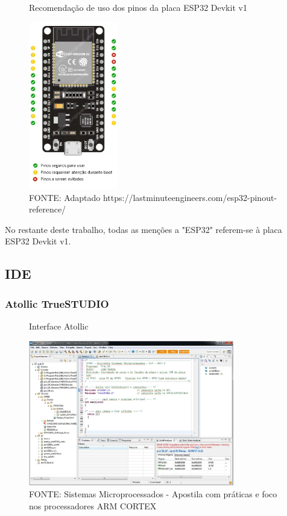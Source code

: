 \begin{figure}[ht]
	\centering
	\caption{Recomendação de uso dos pinos da placa ESP32 Devkit v1}
	\includegraphics[width=0.35\textwidth]{figures/esp32_pinout_ref}
	\caption*{FONTE: Adaptado https://lastminuteengineers.com/esp32-pinout-reference/}
	\label{esp32_pinout_ref}
\end{figure}

No restante deste trabalho, todas as menções a "ESP32" referem-se à placa
ESP32 Devkit v1.


\subsection{IDE}

\subsubsection{Atollic TrueSTUDIO}

\begin{figure}[ht]
	\centering
	\caption{Interface Atollic}
	\includegraphics[width=0.8\textwidth]{figures/atollic}
	\caption*{FONTE: Sistemas Microprocessados - Apostila com práticas e foco nos processadores ARM CORTEX \cite{apostila_microprossados}}
\end{figure}

